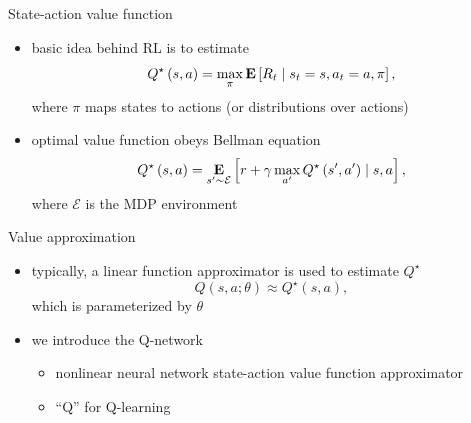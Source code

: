 \begin{frame}{State-action value function}
    \begin{itemize}\itemsep=12pt
        
        \item basic idea behind RL is to estimate
        \[
            Q^{\star}\left(s, a\right) = 
            \max_{\pi}\mathop{\bf E{}}\left[R_{t} \mid s_{t} = s, a_{t} = a, \pi \right],
        \]
        where $\pi$ maps states to actions (or distributions over actions)

        \item optimal value function obeys Bellman equation
        \[
            Q^{\star}\left(s,a\right) = 
            \mathop{\bf E{}}_{s' \sim \mathcal{E}} \left[r + \gamma \max_{a'}Q^{\star}\left(s',a'\right)\mid s, a \right],
        \]
        where $\mathcal{E}$ is the MDP environment

    \end{itemize}
\end{frame}

\begin{frame}{Value approximation}
    \begin{itemize}\itemsep=12pt

        \item typically, a linear function approximator is used to estimate $Q^{\star}$
        \[
            Q\left(s,a; \theta \right) \approx Q^{\star}\left(s,a\right),
        \]
        which is parameterized by $\theta$

        \item we introduce the Q-network 
        \vspace*{0.5em}
        \begin{itemize}
            \item nonlinear neural network state-action value function approximator
            \item ``Q'' for Q-learning
        \end{itemize}

    \end{itemize}
\end{frame}

